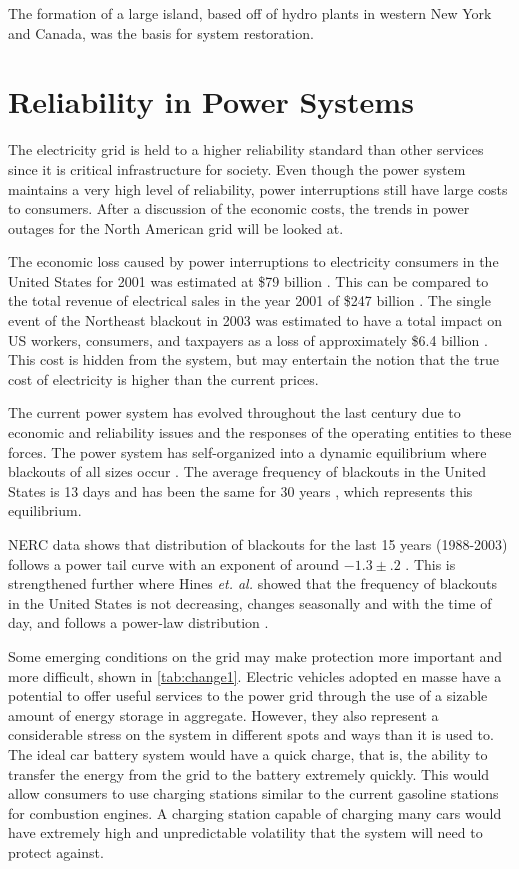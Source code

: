 The formation of a large island, based off of hydro plants in western New York and Canada, was the basis for system restoration.
 

\section{Reliability in Power Systems}
The electricity grid is held to a higher reliability standard than other services since it is critical infrastructure for society.  Even though the power system maintains a very high level of reliability, power interruptions still have large costs to consumers.  After a discussion of the economic costs, the trends in power outages for the North American grid will be looked at.

The economic loss caused by power interruptions to electricity consumers in the United States for 2001 was estimated at \$79 billion \cite{lacommare_2006}.  This can be compared to the total revenue of electrical sales in the year 2001 of \$247 billion \cite{eia_sales}.  The single event of the Northeast blackout in 2003 was estimated to have a total impact on US workers, consumers, and taxpayers as a loss of approximately \$6.4 billion \cite{anderson_2003}.  This cost is hidden from the system, but may entertain the notion that the true cost of electricity is higher than the current prices.  

The current power system has evolved throughout the last century due to economic and reliability issues and the responses of the operating entities to these forces.  The power system has self-organized into a dynamic equilibrium where blackouts of all sizes occur \cite{dobson_2001}.  The average frequency of blackouts in the United States is 13 days and has been the same for 30 years \cite{carreras_2004}, which represents this equilibrium.  
	
NERC data shows that distribution of blackouts for the last 15 years (1988-2003) follows a power tail curve with an exponent of around $-1.3\pm.2$ \cite{carreras_2004}. This is strengthened further where Hines {\it et. al.} showed that the frequency of blackouts in the United States is not decreasing, changes seasonally and with the time of day, and follows a power-law distribution \cite{hines_2008,hines_2009}.

Some emerging conditions on the grid may make protection more important and more difficult, shown in \cref{tab:change1}.  Electric vehicles adopted en masse have a potential to offer useful services to the power grid through the use of a sizable amount of energy storage in aggregate.  However, they also represent a considerable stress on the system in different spots and ways than it is used to.  The ideal car battery system would have a quick charge, that is, the ability to transfer the energy from the grid to the battery extremely quickly.  This would allow consumers to use charging stations similar to the current gasoline stations for combustion engines.  A charging station capable of charging many cars would have extremely high and unpredictable volatility that the system will need to protect against.

